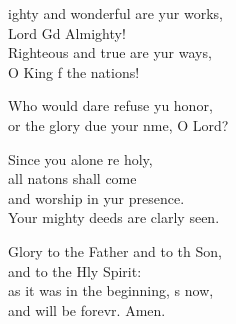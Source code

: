 \settowidth{\versewidth}{Mighty and wonderful are your works, *}
\begin{psalmverse}%
  \begin{patverse}
ighty and wonderful are yur works,\Med\\
Lord Gd Almighty!\\
Righteous and true are yur ways,\Med\\
O King f the nations!

Who would dare refuse yu honor,\Med\\
or the glory due your nme, O Lord?

Since you alone re holy,\Med\\
all nat\pointup{\i}ons shall come\\
and worship in yur presence.\Med\\
Your mighty deeds are clarly seen.

Glory to the Father and to th Son,\Med\\
and to the Hly Spirit:\\
as it was in the beginning, \pointup{\i}s now,\Med\\
and will be forevr. Amen.
  \end{patverse}
\end{psalmverse}
